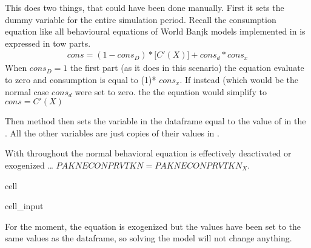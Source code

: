 \documentclass[letterpaper,10pt,english]{jupyterBook}
\begin{document}
\sphinxAtStartPar
This does two things, that could have been done manually.  First it sets the dummy variable  for the entire simulation period. Recall the consumption equation like all behavioural equations of World Banjk models implemented in is expressed in tow parts.
\begin{equation*}
\begin{split} cons= (1-cons_D)*\bigg[C'(X)\bigg] + cons_d*cons_x\end{split}
\end{equation*}
\sphinxAtStartPar
When \(cons_D=1\) the first part (as it does in this scenario) the equation evaluate to zero and consumption is equal to (1)* \(cons_x\).  If instead (which would be the normal case \(cons_d\) were set to zero. the the equation would simplify to \( cons= C'(X) \)

\sphinxAtStartPar
Then  method then sets the variable  in the  dataframe equal to the value of  in the  . All the other variables are  just copies of their values in .

\sphinxAtStartPar
With  throughout the normal behavioral equation is effectively de\sphinxhyphen{}activated or exogenized … \(PAKNECONPRVTKN=PAKNECONPRVTKN_X\).

\begin{sphinxuseclass}{cell}\begin{sphinxVerbatimInput}

\begin{sphinxuseclass}{cell_input}
\begin{sphinxVerbatim}[commandchars=\\\{\}]
 
\end{sphinxVerbatim}

\end{sphinxuseclass}\end{sphinxVerbatimInput}

\end{sphinxuseclass}
\sphinxAtStartPar
For the moment, the equation is exogenized but the values have been set to the same values as the  dataframe, so solving the model will not change anything.
\end{document}
